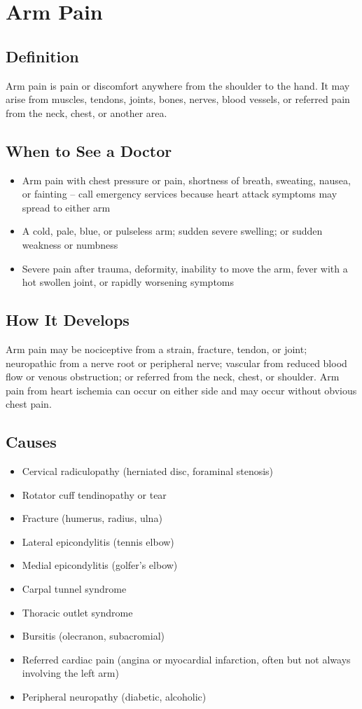 \chapter{Arm Pain}

\section*{Definition}
Arm pain is pain or discomfort anywhere from the shoulder to the hand. It may arise from muscles, tendons, joints, bones, nerves, blood vessels, or referred pain from the neck, chest, or another area.

\section*{When to See a Doctor}

\begin{itemize}
 \item Arm pain with chest pressure or pain, shortness of breath, sweating, nausea, or fainting -- call emergency services because heart attack symptoms may spread to either arm
 \item A cold, pale, blue, or pulseless arm; sudden severe swelling; or sudden weakness or numbness
 \item Severe pain after trauma, deformity, inability to move the arm, fever with a hot swollen joint, or rapidly worsening symptoms
\end{itemize}

\section*{How It Develops}
Arm pain may be nociceptive from a strain, fracture, tendon, or joint; neuropathic from a nerve root or peripheral nerve; vascular from reduced blood flow or venous obstruction; or referred from the neck, chest, or shoulder. Arm pain from heart ischemia can occur on either side and may occur without obvious chest pain.

\section*{Causes}
\begin{itemize}
 \item Cervical radiculopathy (herniated disc, foraminal stenosis)
 \item Rotator cuff tendinopathy or tear
 \item Fracture (humerus, radius, ulna)
 \item Lateral epicondylitis (tennis elbow)
 \item Medial epicondylitis (golfer's elbow)
 \item Carpal tunnel syndrome
 \item Thoracic outlet syndrome
 \item Bursitis (olecranon, subacromial)
 \item Referred cardiac pain (angina or myocardial infarction, often but not always involving the left arm)
 \item Peripheral neuropathy (diabetic, alcoholic)
\end{itemize}

